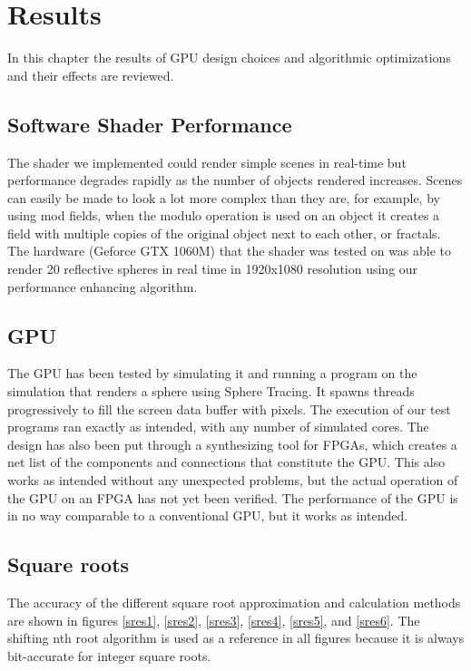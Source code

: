 \chapter{Results}

	In this chapter the results of GPU design choices and algorithmic
	optimizations and their effects are reviewed.

	\section{Software Shader Performance}

		The shader we implemented could render simple scenes in real-time but
		performance degrades rapidly as the number of objects rendered increases.
		Scenes can easily be made to look a lot more complex than they are, for 
		example, by using mod fields, when the modulo operation is used on an object 
		it creates a field with multiple copies of the original object next to each 
		other, or fractals. The hardware (Geforce GTX 1060M) that the shader was tested 
		on was able to render 20 reflective spheres in real time in 1920x1080 
		resolution using our performance enhancing algorithm.
 
	\section{GPU}
	
		The GPU has been tested by simulating it and running a program on the simulation 
		that renders a sphere using Sphere Tracing. It spawns threads
		progressively to fill the screen data buffer with pixels. The execution
		of our test programs ran exactly as intended, with any number of
		simulated cores. The design has also been put through a synthesizing
		tool for FPGAs, which creates a net list of the components and
		connections that constitute the GPU. This also works as intended
		without any unexpected problems, but the actual operation of the GPU on
		an FPGA has not yet been verified. The performance of the GPU is in no way
		comparable to a conventional GPU, but it works as intended.


	
	\section{Square roots}
		
		The accuracy of the different square root approximation and calculation
		methods are shown in figures \ref{sres1}, \ref{sres2}, \ref{sres3},
		\ref{sres4}, \ref{sres5}, and \ref{sres6}. The shifting nth root
		algorithm is used as a reference in all figures because it is always
		bit-accurate for integer square roots.

